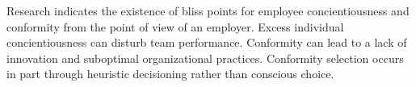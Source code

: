 \documentclass[review]{elsarticle}
\begin{document}

Research indicates the existence of bliss points for employee concientiousness and conformity from the point of view of an employer.
Excess individual concientiousness can disturb team performance\cite{curcseu2019personality}.
Conformity can lead to a lack of innovation and suboptimal organizational practices\cite{symon2006neglected}.
Conformity selection occurs in part through heuristic decisioning rather than conscious choice.



\end{document}

